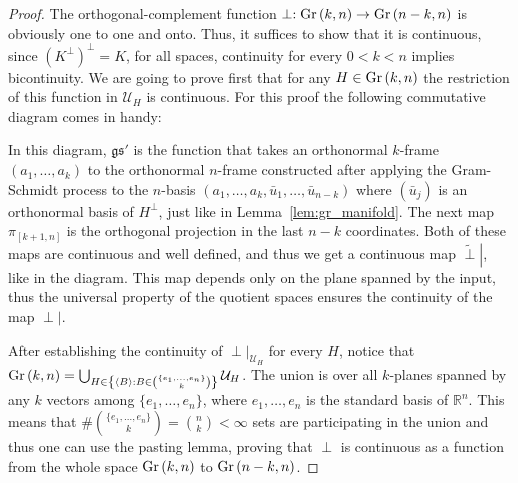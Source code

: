 \begin{proof} The orthogonal-complement function $\perp:\Gr{k}{n}\to\Gr{n-k}{n}$ is obviously one to one and onto. Thus, it suffices to show that it is continuous, since ${\left(K^{\perp}\right)}^{\perp}=K$, for all spaces, continuity for every $0<k<n$ implies bicontinuity. We are going to prove first that for any $H\in\Gr{k}{n}$ the restriction of this function in $\mathcal{U}_H$ is continuous. For this proof the following commutative diagram comes in handy:
\begin{center}
\end{center}
In this diagram, $\mathfrak{gs}'$ is the function that takes an orthonormal $k$-frame $(a_1,\ldots,a_k)$ to the orthonormal $n$-frame constructed after applying the Gram-Schmidt process to the $n$-basis $\left(a_1,\ldots,a_k,\bar{u}_1,\ldots,\bar{u}_{n-k}\right)$ where $\left(\bar{u}_j\right)$ is an orthonormal basis of $H^{\perp}$, just like in Lemma~\ref{lem:gr_manifold}. The next map $\pi_{[k+1,n]}$ is the orthogonal projection in the last $n-k$ coordinates. Both of these maps are continuous and well defined, and thus we get a continuous map $\left.\tilde{\perp}\right|$, like in the diagram. This map depends only on the plane spanned by the input, thus the universal property of the quotient spaces ensures the continuity of the map $\left.\perp\right|$.

After establishing the continuity of $\left.\perp\right|_{\mathcal{U}_H}$ for every $H$, notice that
$\Gr{k}{n} = \bigcup_{H\in\left\{\left<B\right>:B\in\binom{\{e_1,\ldots,e_n\}}{k}\right\}}\mathcal{U}_H$.
The union is over all $k$-planes spanned by any $k$ vectors among $\{e_1,\ldots,e_n\}$, where $e_1,\ldots,e_n$ is the standard basis of $\mathbb{R}^n$. This means that $\#\binom{\{e_1,\ldots,e_n\}}{k}=\binom{n}{k}<\infty$ sets are participating in the union and thus one can use the pasting lemma, proving that $\perp$ is continuous as a function from the whole space $\Gr{k}{n}$ to $\Gr{n-k}{n}$.
\end{proof}

